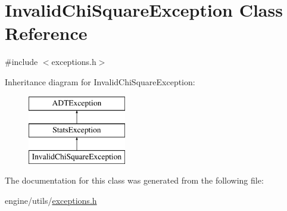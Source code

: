 \hypertarget{classInvalidChiSquareException}{
\section{InvalidChiSquareException Class Reference}
\label{classInvalidChiSquareException}
}


{\ttfamily \#include $<$exceptions.h$>$}

Inheritance diagram for InvalidChiSquareException:\begin{figure}[H]
\begin{center}
\leavevmode
\includegraphics[height=3cm]{classInvalidChiSquareException}
\end{center}
\end{figure}


The documentation for this class was generated from the following file:\begin{DoxyCompactItemize}
\item 
engine/utils/\hyperlink{exceptions_8h}{exceptions.h}\end{DoxyCompactItemize}
